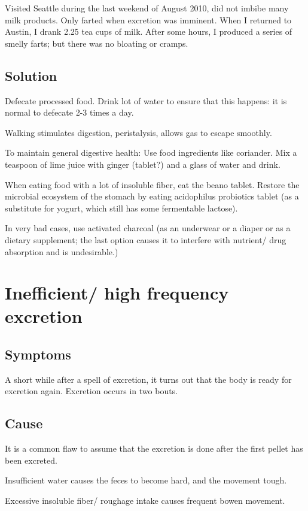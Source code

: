 \documentclass[oneside, article]{memoir}
\begin{document}
Visited Seattle during the last weekend of August 2010, did not imbibe many milk products. Only farted when excretion was imminent. When I returned to Austin, I drank 2.25 tea cups of milk. After some hours, I produced a series of smelly farts; but there was no bloating or cramps.



\subsection{Solution}
Defecate processed food. Drink lot of water to ensure that this happens: it is normal to defecate 2-3 times a day.

Walking stimulates digestion, peristalysis, allows gas to escape smoothly.

To maintain general digestive health: Use food ingredients like coriander. Mix a teaspoon of lime juice with ginger (tablet?) and a glass of water and drink.

When eating food with a lot of insoluble fiber, eat the beano tablet. Restore the microbial ecosystem of the stomach by eating acidophilus probiotics tablet (as a substitute for yogurt, which still has some fermentable lactose).

In very bad cases, use activated charcoal (as an underwear or a diaper or as a dietary supplement; the last option causes it to interfere with nutrient/ drug absorption and is undesirable.)

\section{Inefficient/ high frequency excretion}
\subsection{Symptoms}
A short while after a spell of excretion, it turns out that the body is ready for excretion again. Excretion occurs in two bouts.

\subsection{Cause}
It is a common flaw to assume that the excretion is done after the first pellet has been excreted.

Insufficient water causes the feces to become hard, and the movement tough.

Excessive insoluble fiber/ roughage intake causes frequent bowen movement.
\end{document}
